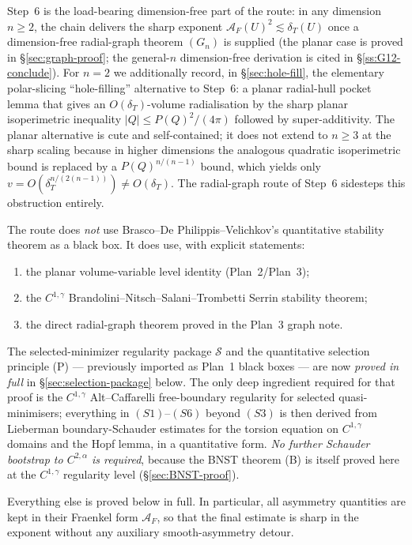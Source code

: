 \documentclass[11pt]{amsart}
\newcommand{\dT}{\delta_T}
\newcommand{\AF}{\mathcal A_F}
\newcommand{\Sclass}{\mathcal S}
\begin{document}
Step~6 is the load-bearing dimension-free part of the route: in any
dimension $n\ge 2$, the chain delivers the sharp exponent
$\AF(U)^2\lesssim\dT(U)$ once a dimension-free radial-graph theorem
$(G_n)$ is supplied (the planar case is proved in
\S\ref{sec:graph-proof}; the general-$n$ dimension-free derivation is
cited in \S\ref{ss:G12-conclude}).  For $n=2$ we additionally record,
in \S\ref{sec:hole-fill}, the elementary polar-slicing
``hole-filling'' alternative to Step~6: a planar radial-hull pocket
lemma that gives an $O(\dT)$-volume radialisation by the sharp
planar isoperimetric inequality $|Q|\le P(Q)^2/(4\pi)$ followed by
super-additivity.  The planar alternative is cute and self-contained;
it does not extend to $n\ge 3$ at the sharp scaling because in higher
dimensions the analogous quadratic isoperimetric bound is replaced
by a $P(Q)^{n/(n-1)}$ bound, which yields only
$v=O(\dT^{n/(2(n-1))})\not=O(\dT)$.  The radial-graph route of
Step~6 sidesteps this obstruction entirely.

The route does \emph{not} use Brasco--De Philippis--Velichkov's
quantitative stability theorem as a black box.  It does use, with
explicit statements:

\begin{enumerate}[label=(I\arabic*)]
\item the planar volume-variable level identity (Plan~2/Plan~3);
\item the $C^{1,\gamma}$ Brandolini--Nitsch--Salani--Trombetti
Serrin stability theorem;
\item the direct radial-graph theorem proved in the Plan~3 graph note.
\end{enumerate}

The selected-minimizer regularity package $\Sclass$ and the
quantitative selection principle (P) --- previously imported as
Plan~1 black boxes --- are now \emph{proved in full} in
\S\ref{sec:selection-package} below.  The only deep ingredient
required for that proof is the $C^{1,\gamma}$ Alt--Caffarelli
free-boundary regularity for selected quasi-minimisers; everything
in $(S1)$--$(S6)$ beyond $(S3)$ is then derived from Lieberman
boundary-Schauder estimates for the torsion equation on
$C^{1,\gamma}$ domains and the Hopf lemma, in a quantitative form.
\emph{No further Schauder bootstrap to $C^{2,\alpha}$ is required},
because the BNST theorem (B) is itself proved here at the
$C^{1,\gamma}$ regularity level (\S\ref{sec:BNST-proof}).

Everything else is proved below in full.  In particular, all asymmetry
quantities are kept in their Fraenkel form \(\AF\), so that the final
estimate is sharp in the exponent without any auxiliary smooth-asymmetry
detour.
\end{document}
